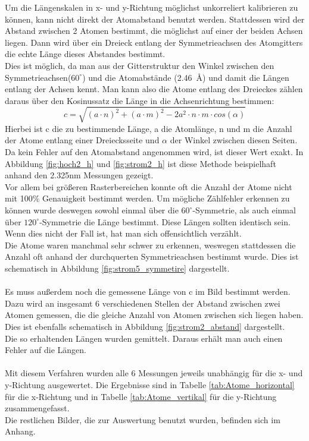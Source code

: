 \documentclass[12pt,a4paper]{article}
\begin{document}
Um die Längenskalen in x- und y-Richtung möglichst unkorreliert kalibrieren zu können, kann nicht direkt der Atomabstand benutzt werden. Stattdessen wird der Abstand zwischen 2 Atomen bestimmt, die möglichst auf einer der beiden Achsen liegen. Dann wird über ein Dreieck entlang der Symmetrieachsen des Atomgitters die echte Länge dieses Abstandes bestimmt.\\
Dies ist möglich, da man aus der Gitterstruktur den Winkel zwischen den Symmetrieachsen($60^{\circ}$) und die Atomabstände (\SI{2.46}{\angstrom}) und damit die Längen entlang der Achsen kennt. Man kann also die Atome entlang des Dreieckes zählen daraus über den Kosinussatz die Länge in die Achsenrichtung bestimmen:
\begin{equation}
c = \sqrt{(a\cdot n)^{2}+(a\cdot m)^2-2 a^{2}\cdot n\cdot m\cdot cos(\alpha)}
\end{equation}
Hierbei ist c die zu bestimmende Länge, a die Atomlänge, n und m die Anzahl der Atome entlang einer Dreiecksseite und $\alpha$ der Winkel zwischen diesen Seiten.\\Da kein Fehler auf den Atomabstand angenommen wird, ist dieser Wert exakt.
In Abbildung \ref{fig:hoch2_h} und \ref{fig:strom2_h} ist diese Methode beispielhaft anhand den 2.325nm Messungen gezeigt.\\
Vor allem bei größeren Rasterbereichen konnte oft die Anzahl der Atome nicht mit 100\% Genauigkeit bestimmt werden.
Um mögliche Zählfehler erkennen zu können wurde deswegen sowohl einmal über die  $60^{\circ}$-Symmetrie, als auch einmal über $120^{\circ}$-Symmetrie die Länge bestimmt. Diese Längen sollten identisch sein. Wenn dies nicht der Fall ist, hat man sich offensichtlich verzählt.\\
Die Atome waren manchmal sehr schwer zu erkennen, weswegen stattdessen die Anzahl oft anhand der durchquerten Symmetrieachsen bestimmt wurde. Dies ist schematisch in Abbildung \ref{fig:strom5_symmetire} dargestellt.\\
\\
Es muss außerdem noch die gemessene Länge von c im Bild bestimmt werden.\\
Dazu wird an insgesamt 6 verschiedenen Stellen der Abstand zwischen zwei Atomen gemessen, die die gleiche Anzahl von Atomen zwischen sich liegen haben.
Dies ist ebenfalls schematisch in Abbildung \ref{fig:strom2_abstand} dargestellt.\\
Die so erhaltenden Längen wurden gemittelt. Daraus erhält man auch einen Fehler auf die Längen.\\
\\
Mit diesem Verfahren wurden alle 6 Messungen jeweils unabhängig für die x- und y-Richtung ausgewertet. Die Ergebnisse sind in Tabelle \ref{tab:Atome_horizontal} für die x-Richtung und in Tabelle \ref{tab:Atome_vertikal} für die y-Richtung zusammengefasst.\\
Die restlichen Bilder, die zur Auswertung benutzt wurden, befinden sich im Anhang.\\
\end{document}
